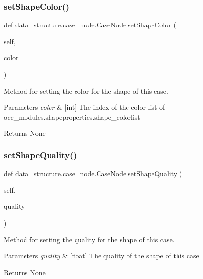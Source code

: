 \subsubsection{\texorpdfstring{set\+Shape\+Color()}{setShapeColor()}}
{\footnotesize\ttfamily def data\+\_\+structure.\+case\+\_\+node.\+Case\+Node.\+set\+Shape\+Color (\begin{DoxyParamCaption}\item[{}]{self,  }\item[{}]{color }\end{DoxyParamCaption})}



Method for setting the color for the shape of this case. 


\begin{DoxyParams}{Parameters}
{\em color} & \mbox{[}int\mbox{]} The index of the color list of occ\+\_\+modules.\+shapeproperties.\+shape\+\_\+colorlist \\
\hline
\end{DoxyParams}
\begin{DoxyReturn}{Returns}
None 
\end{DoxyReturn}
\hypertarget{classdata__structure_1_1case__node_1_1_case_node_a7bc800f55127489e601b7ddbaa6ad2cb}{}\label{classdata__structure_1_1case__node_1_1_case_node_a7bc800f55127489e601b7ddbaa6ad2cb} 
\subsubsection{\texorpdfstring{set\+Shape\+Quality()}{setShapeQuality()}}
{\footnotesize\ttfamily def data\+\_\+structure.\+case\+\_\+node.\+Case\+Node.\+set\+Shape\+Quality (\begin{DoxyParamCaption}\item[{}]{self,  }\item[{}]{quality }\end{DoxyParamCaption})}



Method for setting the quality for the shape of this case. 


\begin{DoxyParams}{Parameters}
{\em quality} & \mbox{[}float\mbox{]} The quality of the shape of this case \\
\hline
\end{DoxyParams}
\begin{DoxyReturn}{Returns}
None 
\end{DoxyReturn}
\hypertarget{classdata__structure_1_1case__node_1_1_case_node_a4ee5ef91001b2c4db57c268338ef287e}{}\label{classdata__structure_1_1case__node_1_1_case_node_a4ee5ef91001b2c4db57c268338ef287e} 
